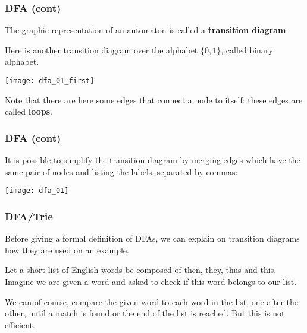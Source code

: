 % 
\begin{frame}
\frametitle{DFA (cont)}

The graphic representation of an automaton is called a
\textbf{transition diagram}.

\bigskip

Here is another transition diagram over
the alphabet \(\{0,1\}\), called binary alphabet.
\begin{center}
\texttt{[image: dfa\_01\_first]}
\end{center} 
Note that there are here some edges that connect a node to
itself: these edges are called \textbf{loops}.

\end{frame}

% 
\begin{frame}
\frametitle{DFA (cont)}

\label{dfa_01}

It is possible to simplify the transition diagram by merging edges
which have the same pair of nodes and listing the labels, separated by
commas:
\begin{center}
\texttt{[image: dfa\_01]}
\end{center} 

\end{frame}

% 
\begin{frame}
\frametitle{DFA/Trie}

Before giving a formal definition of DFAs, we can explain on
transition diagrams how they are used on an example.

\bigskip

Let a short list of English words be composed of \textsf{then},
\textsf{they}, \textsf{thus} and \textsf{this}. Imagine we are given a
word and asked to check if this word belongs to our list. 

\bigskip

We can of course, compare the given word to each word in the list, one
after the other, until a match is found or the end of the list is
reached. But this is not efficient.

\end{frame}


